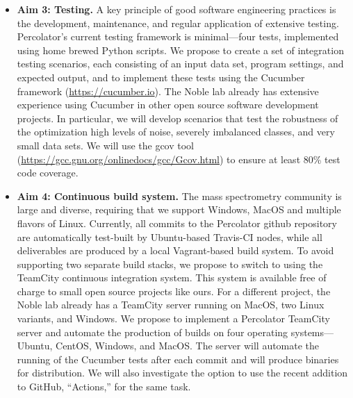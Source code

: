 \documentclass{article}
\begin{document}
\begin{itemize}
\item {\bf Aim 3: Testing.} A key principle of good software engineering practices is the development, maintenance, and regular application of extensive testing. Percolator's current testing framework is minimal---four tests, implemented using home brewed Python scripts.  We propose to create a set of integration testing scenarios, each consisting of an input data set, program settings, and expected output, and to implement these tests using the Cucumber framework (\href{https://cucumber.io} {https://cucumber.io}). The Noble lab already has extensive experience using Cucumber in other open source software development projects. In particular, we will develop scenarios that test the robustness of the optimization high levels of noise, severely imbalanced classes, and very small data sets. We will use the gcov tool (\href{https://gcc.gnu.org/onlinedocs/gcc/Gcov.html} {https://gcc.gnu.org/onlinedocs/gcc/Gcov.html}) to ensure at least 80\% test code coverage.%

\item {\bf Aim 4: Continuous build system.} The mass spectrometry community is large and diverse, requiring that we support Windows, MacOS and multiple flavors of Linux.  Currently, all commits to the Percolator github repository are automatically test-built by Ubuntu-based Travis-CI nodes, while all deliverables are produced by a local Vagrant-based build system. To avoid supporting two separate build stacks, we propose to switch to using the TeamCity continuous integration system.  This system is available free of charge to small open source projects like ours.  For a different project, the Noble lab already has a TeamCity server running on MacOS, two Linux variants, and Windows.   We propose to implement a Percolator TeamCity server and automate the production of builds on four operating systems---Ubuntu, CentOS, Windows, and MacOS.  The server will automate the running of the Cucumber tests after each commit and will produce binaries for distribution. We will also investigate the option to use the recent addition to GitHub, ``Actions,'' for the same task.
\end{itemize}




\end{document}
